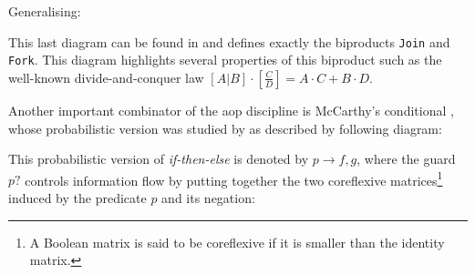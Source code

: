 \documentclass[
  oneside,
  11pt, a4paper,
  footinclude=true,
  headinclude=true,
  cleardoublepage=empty
]{scrbook}
\theoremstyle{definition}
\theoremstyle{definition}
\begin{document}
        Generalising:
        
        \begin{center}
        \end{center}{}
        
        This last diagram can be found in \citep{Macedo2012MatricesAA} and defines exactly the biproducts \texttt{Join} and \texttt{Fork}. This diagram highlights several properties of this biproduct such as the well-known divide-and-conquer law $[A|B] \cdot [\frac{C}{D}] = A \cdot C + B \cdot D$.
        
        Another important combinator of the \gls{aop} discipline is McCarthy's conditional \citep{Bird:1997:AP:248932}, whose probabilistic version was studied by \cite{oliveira2012towards} as described by following diagram:
        
        \begin{center}\label{dig-mccarthy}
        \end{center}{}
        
        \noindent This probabilistic version of \emph{if-then-else} is denoted by $p \rightarrow f,g$, where the guard $p?$ controls information flow by putting together the two coreflexive matrices\footnote{A Boolean matrix is said to be coreflexive if it is smaller than the identity matrix.} induced by the predicate $p$ and its negation:
        
\end{document}
